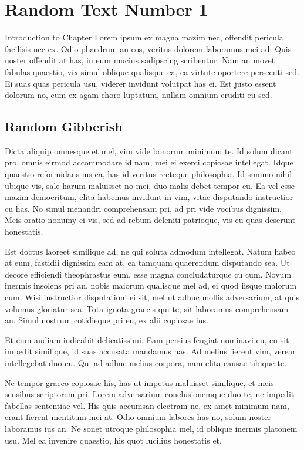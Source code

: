 
\chapter{Random Text Number 1}

Introduction to Chapter Lorem ipsum ex magna mazim nec, offendit pericula facilisis nec ex. Odio phaedrum an eos, veritus dolorem laboramus mei ad. Quis noster offendit at has, in eum mucius sadipscing scribentur. Nam an movet fabulas quaestio, vix simul oblique qualisque ea, ea virtute oportere persecuti sed. Ei suas quas pericula usu, viderer invidunt volutpat has ei. Est justo essent dolorum no, eum ex agam choro luptatum, nullam omnium eruditi eu sed.

\section{Random Gibberish}

Dicta aliquip omnesque et mel, vim vide bonorum minimum te. Id solum dicant pro, omnis eirmod accommodare id nam, mei ei exerci copiosae intellegat. Idque quaestio reformidans ius ea, has id veritus recteque philosophia. Id summo nihil ubique vis, sale harum maluisset no mei, duo malis debet tempor eu. Ea vel esse mazim democritum, clita habemus invidunt in vim, vitae disputando instructior cu has. No simul menandri comprehensam pri, ad pri vide vocibus dignissim. Meis oratio nonumy ei vis, sed ad rebum deleniti patrioque, vis eu quas deserunt honestatis.

Est doctus laoreet similique ad, ne qui soluta admodum intellegat. Natum habeo at eum, fastidii dignissim eam at, ea tamquam quaerendum disputando sea. Ut decore efficiendi theophrastus eum, esse magna concludaturque cu cum. Novum inermis insolens pri an, nobis maiorum qualisque mel ad, ei quod iisque malorum cum. Wisi instructior disputationi ei sit, mel ut adhuc mollis adversarium, at quis volumus gloriatur sea. Tota ignota graecis qui te, sit laboramus comprehensam an. Simul nostrum cotidieque pri eu, ex alii copiosae ius.

Et eum audiam iudicabit delicatissimi. Eam persius feugiat nominavi cu, cu sit impedit similique, id suas accusata mandamus has. Ad melius fierent vim, verear intellegebat duo cu. Qui ad adhuc melius corpora, nam clita causae tibique te.

Ne tempor graeco copiosae his, has ut impetus maluisset similique, et meis sensibus scriptorem pri. Lorem adversarium conclusionemque duo te, ne impedit fabellas sententiae vel. His quis accumsan electram ne, ex amet minimum nam, erant fierent mentitum mei at. Odio omnium labores has no, solum noster laboramus ius an. Ne sonet utroque philosophia mel, id oblique inermis platonem usu. Mel ea invenire quaestio, his quot lucilius honestatis et.

